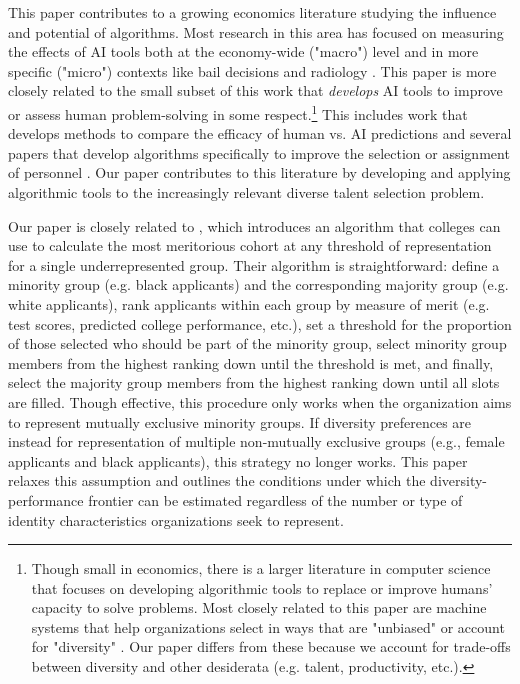 This paper contributes to a growing economics literature studying the influence and potential of algorithms. Most research in this area has focused on measuring the effects of AI tools both at the economy-wide ("macro") level \cite{acemoglu2022automation,babina2024artificial,calvino2023portrait,zolas2021advanced,webb2019impact} and in more specific ("micro") contexts like bail decisions and radiology \cite{albright2023hidden,kleinberg2015prediction,stevenson2019algorithmic,angelova2023algorithmic,imai2023experimental,grimon2022impact,noy2023experimental,brynjolfsson2023generative,bundorf2019humans, mullainathan2019machine, ribers2020machine, agarwal2023combining}. This paper is more closely related to the small subset of this work that \emph{develops} AI tools to improve or assess human problem-solving in some respect.\footnote{Though small in economics, there is a larger literature in computer science that focuses on developing algorithmic tools to replace or improve humans' capacity to solve problems. Most closely related to this paper are machine systems that help organizations select in ways that are "unbiased" \cite{tambe2019artificial,raghavan2020mitigating} or account for "diversity" \cite{gillet_diversity_2011,huppenkothen2020entrofy}. Our paper differs from these because we account for trade-offs between diversity and other desiderata (e.g. talent, productivity, etc.).}  This includes work that develops methods to compare the efficacy of human vs. AI predictions \cite{kleinberg2018human,rambachan2024identifying} and several papers that develop algorithms specifically to improve the selection or assignment of personnel \cite{li2020hiring,bergman2021seven,kleinberg2018algorithmic,huppenkothen2020entrofy}. Our paper contributes to this literature by developing and applying algorithmic tools to the increasingly relevant diverse talent selection problem. 

Our paper is closely related to \textcite{kleinberg2018algorithmic}, which introduces an algorithm that colleges can use to calculate the most meritorious cohort at any threshold of representation for a single underrepresented group. Their algorithm is straightforward: define a minority group (e.g. black applicants) and the corresponding majority group (e.g. white applicants), rank applicants within each group by measure of merit (e.g. test scores, predicted college performance, etc.), set a threshold for the proportion of those selected who should be part of the minority group, select minority group members from the highest ranking down until the threshold is met, and finally, select the majority group members from the highest ranking down until all slots are filled. Though effective, this procedure only works when the organization aims to represent mutually exclusive minority groups. If diversity preferences are instead for representation of multiple non-mutually exclusive groups (e.g., female applicants and black applicants), this strategy no longer works. This paper relaxes this assumption and outlines the conditions under which the diversity-performance frontier can be estimated regardless of the number or type of identity characteristics organizations seek to represent.

